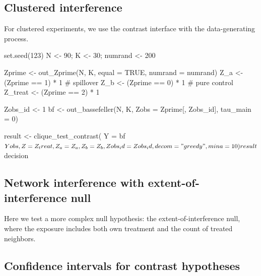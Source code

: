 \documentclass[article]{jss}
\begin{document}
\subsection{Clustered interference}

For clustered experiments, we use the contrast interface with the
\citet{basse2018model} data-generating process.

\begin{Code}
set.seed(123)
N <- 90; K <- 30; numrand <- 200

Zprime <- out_Zprime(N, K, equal = TRUE, numrand = numrand)
Z_a <- (Zprime == 1) * 1   # spillover
Z_b <- (Zprime == 0) * 1   # pure control
Z_treat <- (Zprime == 2) * 1

Zobs_id <- 1
bf <- out_bassefeller(N, K, Zobs = Zprime[, Zobs_id], tau_main = 0)

result <- clique_test_contrast(
  Y = bf$Yobs, Z = Z_treat, Z_a = Z_a, Z_b = Z_b,
  Zobs_id = Zobs_id, decom = "greedy", mina = 10
)
result$decision
\end{Code}

\subsection{Network interference with extent-of-interference null}

Here we test a more complex null hypothesis: the extent-of-interference
null, where the exposure includes both own treatment and the count of
treated neighbors.


\subsection{Confidence intervals for contrast hypotheses}
\end{document}
